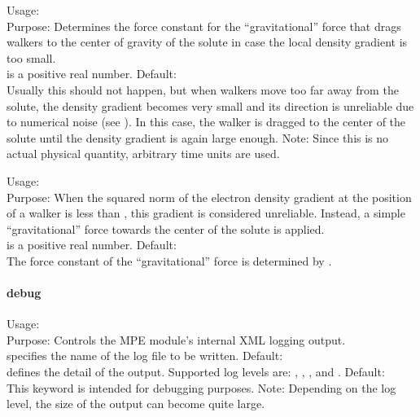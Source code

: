 {
  \noindent
  Usage:   \\[1.0ex] 
  Purpose: Determines the force constant  
    for the ``gravitational'' force that drags walkers to the 
    center of gravity of the solute in case the local 
    density gradient is too small. \\[1.0ex]
   is a positive real number. Default:  \\
}
Usually this should not happen, but when walkers move too 
far away from the solute, the density gradient becomes 
very small and its direction is unreliable due to numerical 
noise (see ).
In this case, the walker is dragged to the center of the 
solute until the density gradient is again large enough. 
Note: Since this is no actual physical quantity, arbitrary 
time units are used. 

{
  \noindent
  Usage:  
     \\[1.0ex] 
  Purpose: When the squared norm of the electron density 
    gradient at the position of a walker is less than 
    , this gradient is considered unreliable. 
    Instead, a simple ``gravitational'' force towards the 
    center of the solute is applied. \\[1.0ex]
   is a positive real number. 
    Default:  \\
}
The force constant of the ``gravitational'' force is 
determined by .


\paragraph{debug}

{
  \noindent
  Usage:   
     \\[1.0ex] 
  Purpose: Controls the MPE module's internal XML logging 
    output. \\[1.0ex]
   specifies the name of the log file 
    to be written. Default:  \\
   defines the detail of the output. Supported 
    log levels are: , , , and
    . Default:  \\
}
This keyword is intended for debugging purposes. 
Note: Depending on the log level, the size of the output 
can become quite large. 


